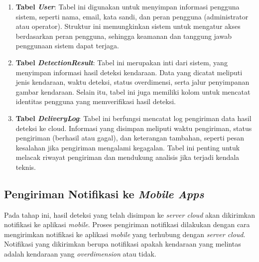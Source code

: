 \begin{enumerate}[nolistsep,label=\textbf{\arabic*.}]

  \item \textbf{Tabel \emph{User}}: Tabel ini digunakan untuk menyimpan informasi pengguna sistem, seperti nama, email, kata sandi, dan peran pengguna (administrator atau operator). Struktur ini memungkinkan sistem untuk mengatur akses berdasarkan peran pengguna, sehingga keamanan dan tanggung jawab penggunaan sistem dapat terjaga.
  \item \textbf{Tabel \emph{DetectionResult}}: Tabel ini merupakan inti dari sistem, yang menyimpan informasi hasil deteksi kendaraan. Data yang dicatat meliputi jenis kendaraan, waktu deteksi, status overdimensi, serta jalur penyimpanan gambar kendaraan. Selain itu, tabel ini juga memiliki kolom untuk mencatat identitas pengguna yang memverifikasi hasil deteksi.
  \item \textbf{Tabel \emph{DeliveryLog}}: Tabel ini berfungsi mencatat log pengiriman data hasil deteksi ke cloud. Informasi yang disimpan meliputi waktu pengiriman, status pengiriman (berhasil atau gagal), dan keterangan tambahan, seperti pesan kesalahan jika pengiriman mengalami kegagalan. Tabel ini penting untuk melacak riwayat pengiriman dan mendukung analisis jika terjadi kendala teknis.
\end{enumerate}

\subsection{Pengiriman Notifikasi ke \emph{Mobile Apps}}

Pada tahap ini, hasil deteksi yang telah disimpan ke \emph{server cloud} akan dikirimkan notifikasi ke aplikasi \emph{mobile}. Proses pengiriman notifikasi dilakukan dengan cara mengirimkan notifikasi ke aplikasi \emph{mobile} yang terhubung dengan \emph{server cloud}. Notifikasi yang dikirimkan berupa notifikasi apakah kendaraan yang melintas adalah kendaraan yang \emph{overdimension} atau tidak.